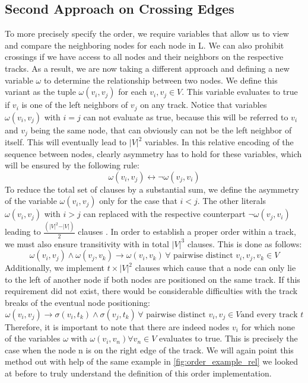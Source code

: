 \documentclass[bachelor, english]{algothesis}
\begin{document}
\subsection{Second Approach on Crossing Edges}
\label{sec:approach2}
To more precisely specify the order, we require variables that allow us to view and compare the neighboring nodes for each node in L. We can also prohibit crossings if we have access to all nodes and their neighbors on the respective tracks. As a result, we are now taking a different approach and defining a new variable $\omega$ to determine the relationship between two nodes. We define this variant as the tuple $\omega(v_i,v_j)$ for each $v_i,v_j \in V$. This variable evaluates to true if $v_i$ is one of the left neighbors of $v_j$ on any track.  Notice that variables $\omega(v_i,v_j)$ with $i = j$ can not evaluate as true, because this will be referred to $v_i$ and $v_j$ being the same node, that can obviously can not be the left neighbor of itself. This will eventually lead to ${\vert V \vert}^2$ variables. In this relative encoding of the sequence between nodes, clearly asymmetry has to hold for these variables, which will be ensured by the following rule:
    $$ \omega(v_i,v_j) \leftrightarrow \lnot \omega(v_j,v_i) $$
To reduce the total set of clauses by a substantial sum, we define the asymmetry of the variable $\omega(v_i,v_j)$ only for the case that $i < j$. The other literals $\omega(v_i,v_j)$ with $i > j$ can replaced with the respective counterpart $\lnot \omega(v_j,v_i)$ leading to $\frac{(\vert V \vert^2-\vert V \vert)}{2}$ clauses \cite{asymmetric}. In order to establish a proper order within a track, we must also ensure transitivity with in total ${\vert V \vert}^3$ clauses. This is done as follows:
    $$ \omega(v_i,v_j) \land \omega(v_j,v_k) \rightarrow \omega(v_i,v_k) \, \forall \text{ pairwise distinct } v_i,v_j,v_k \in V$$
Additionally, we implement $t \times {\vert V \vert}^2$ clauses which cause that a node can only lie to the left of another node if both nodes are
positioned on the same track. If this requirement did not exist, there would be considerable difficulties with the track breaks of the eventual node positioning:
    $$ \omega(v_i,v_j) \rightarrow \sigma(v_i,t_k) \land \sigma(v_j,t_k) \, \forall \text{ pairwise distinct } v_i,v_j \in V \text{and every track }t$$
Therefore, it is important to note that there are indeed nodes $v_i$ for which none of the variables $\omega$ with $\omega(v_i,v_n) \forall v_n \in V$ evaluates to true. This is precisely the case when the node n is on the right edge of the track. We will again point  this method out with help of the same example in \cref{fig:order_example_rel} we looked at before to truly understand the definition of this order implementation.
\end{document}
